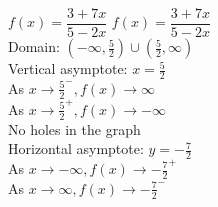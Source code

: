 {$f(x) = \dfrac{3 + 7x}{5 - 2x}$}
{$f(x) = \dfrac{3 + 7x}{5 - 2x}$\\
Domain: $(-\infty, \frac{5}{2}) \cup (\frac{5}{2}, \infty)$\\
Vertical asymptote: $x = \frac{5}{2}$\\
As $x \rightarrow \frac{5}{2}^{-}, f(x) \rightarrow \infty$\\
As $x \rightarrow \frac{5}{2}^{+}, f(x) \rightarrow -\infty$\\
No holes in the graph\\
Horizontal asymptote: $y = -\frac{7}{2}$ \\
As $x \rightarrow -\infty, f(x) \rightarrow -\frac{7}{2}^{+}$\\
As $x \rightarrow \infty, f(x) \rightarrow -\frac{7}{2}^{-}$}